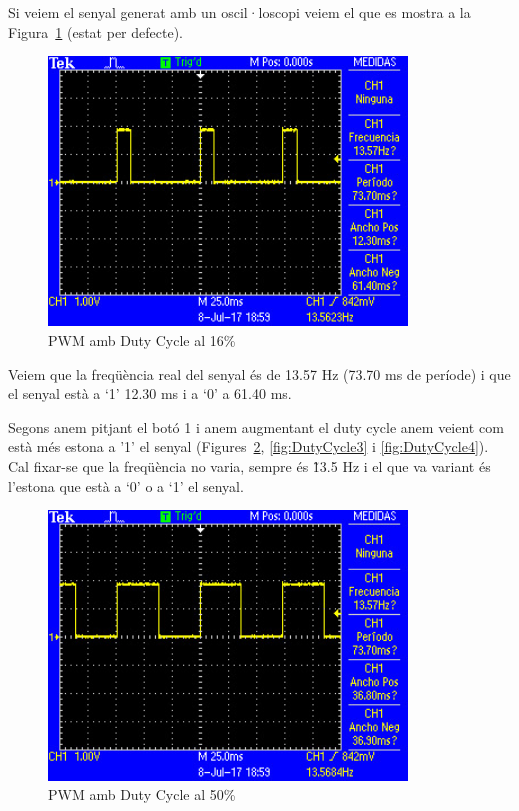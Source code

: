 Si veiem el senyal generat amb un oscil·loscopi veiem el que es mostra a la Figura~\ref{fig:DutyCycle1} (estat per defecte).
\begin{figure}
 \centering
 \includegraphics[width=0.85\textwidth, keepaspectratio]{imatges/DutyCycle1.png}
 \caption{PWM amb Duty Cycle al 16\%}
 \label{fig:DutyCycle1}
\end{figure}

Veiem que la freqüència real del senyal és de 13.57 Hz (73.70 ms de període) i que el senyal està a ‘1' 12.30 ms i a ‘0' a 61.40 ms.

Segons anem pitjant el botó 1 i anem augmentant el \gls{duty cycle} anem veient com està més estona a '1' el senyal (Figures~\ref{fig:DutyCycle2},
\ref{fig:DutyCycle3} i \ref{fig:DutyCycle4}).
Cal fixar-se que la freqüència no varia, sempre és \~13.5 Hz i el que va variant és l'estona que està a ‘0' o a ‘1' el senyal.

\begin{figure}
 \centering
 \includegraphics[width=0.85\textwidth, keepaspectratio]{imatges/DutyCycle2.png}
 \caption{PWM amb Duty Cycle al 50\%}
 \label{fig:DutyCycle2}
\end{figure}

